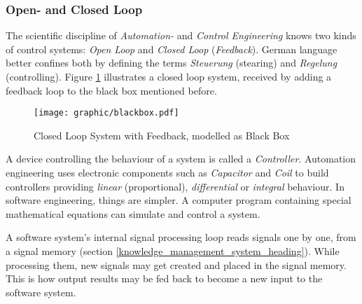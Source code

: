 %
%
%
%
%
%
%

\subsubsection{Open- and Closed Loop}
\label{open_and_closed_loop_heading}

The scientific discipline of \emph{Automation-} and \emph{Control Engineering}
knows two kinds of control systems: \emph{Open Loop} and \emph{Closed Loop}
(\emph{Feedback}). German language better confines both by defining the terms
\emph{Steuerung} (stearing) and \emph{Regelung} (controlling). Figure
\ref{blackbox_figure} illustrates a closed loop system, received by adding a
feedback loop to the black box mentioned before.

\begin{figure}[ht]
    \begin{center}
        \texttt{[image: graphic/blackbox.pdf]}
        \caption{Closed Loop System with Feedback, modelled as Black Box}
        \label{blackbox_figure}
    \end{center}
\end{figure}

\newpage

A device controlling the behaviour of a system is called a \emph{Controller}.
Automation engineering uses electronic components such as \emph{Capacitor} and
\emph{Coil} to build controllers providing \emph{linear} (proportional),
\emph{differential} or \emph{integral} behaviour. In software engineering,
things are simpler. A computer program containing special mathematical
equations can simulate and control a system.

A software system's internal signal processing loop reads signals one by one,
from a signal memory (section \ref{knowledge_management_system_heading}).
While processing them, new signals may get created and placed in the signal
memory. This is how output results may be fed back to become a new input to the
software system.
